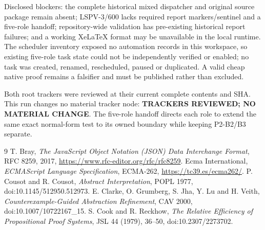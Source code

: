 \documentclass[11pt]{article}
\begin{document}
Disclosed blockers: the complete historical mixed dispatcher and original source package remain absent;
LSPV-3/600 lacks required report markers/sentinel and a five-role handoff; repository-wide validation has
pre-existing historical report failures; and a working XeLaTeX format may be unavailable in the local
runtime.  The scheduler inventory exposed no automation records in this workspace, so existing five-role
task state could not be independently verified or enabled; no task was created, renamed, rescheduled,
paused or duplicated.  A valid cheap native proof remains a falsifier and must be published rather than
excluded.

Both root trackers were reviewed at their current complete contents and SHA.  This run changes no
material tracker node: \textbf{TRACKERS REVIEWED; NO MATERIAL CHANGE}.  The five-role handoff directs each
role to extend the same exact normal-form test to its owned boundary while keeping P2-B2/B3 separate.

\begin{thebibliography}{9}
 T. Bray, \emph{The JavaScript Object Notation (JSON) Data Interchange Format},
RFC 8259, 2017, \url{https://www.rfc-editor.org/rfc/rfc8259}.
 Ecma International, \emph{ECMAScript Language Specification}, ECMA-262,
\url{https://tc39.es/ecma262/}.
 P. Cousot and R. Cousot, \emph{Abstract Interpretation}, POPL 1977,
doi:10.1145/512950.512973.
 E. Clarke, O. Grumberg, S. Jha, Y. Lu and H. Veith,
\emph{Counterexample-Guided Abstraction Refinement}, CAV 2000,
doi:10.1007/10722167\_15.
 S. Cook and R. Reckhow, \emph{The Relative Efficiency of Propositional Proof Systems},
JSL 44 (1979), 36--50, doi:10.2307/2273702.
\end{thebibliography}
\end{document}
